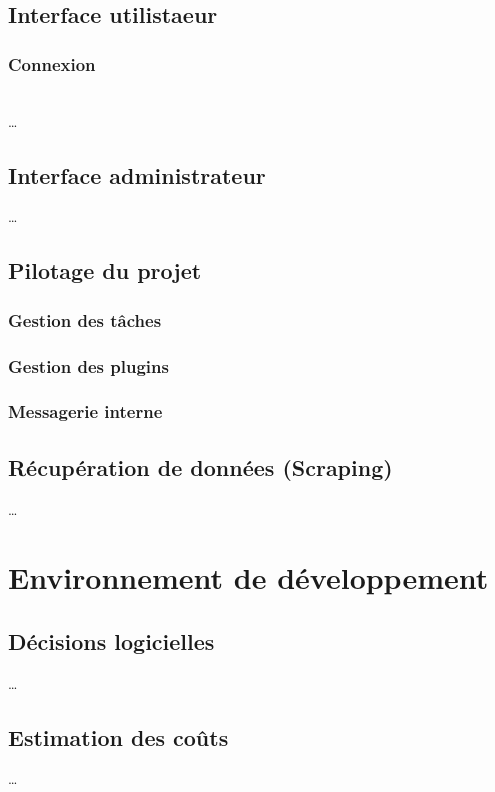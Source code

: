\documentclass[conference]{IEEEtran}
\begin{document}
\subsection{Interface utilistaeur}

\subsubsection{Connexion}
\hfil\\
…

\subsection{Interface administrateur}
…

\subsection{Pilotage du projet}

\subsubsection{Gestion des tâches}

\subsubsection{Gestion des plugins}

\subsubsection{Messagerie interne}

\subsection{Récupération de données (Scraping)}
…

\section{Environnement de développement}

\subsection{Décisions logicielles}
…

\subsection{Estimation des coûts}
…
\end{document}
